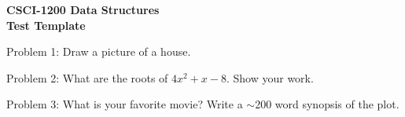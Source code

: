 \documentclass[10pt]{article}
\begin{document}
\begin{center}
  \LARGE \textbf{
    CSCI-1200 Data Structures \\
    Test Template}
\end{center}

Problem 1: Draw a picture of a house.

\fbox{\parbox{6.9in}{ \ \vspace{4in} \ }}

\vspace{0.2in}



Problem 2: What are the roots of $ 4x^2 + x -8 $.  Show your work.

\fbox{\parbox{6.9in}{ \ \vspace{4in} \ }}

\newpage

Problem 3: What is your favorite movie?  Write a $\sim$200 word
synopsis of the plot.

\fbox{\parbox{6.9in}{ \ \vspace{9.5in} \ }}

\newpage



\end{document}
